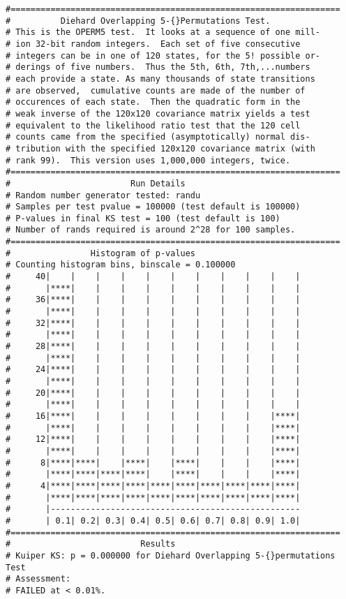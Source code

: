 \documentclass[12pt]{book}
\begin{document}
{\begin{verbatim}
#==================================================================
#          Diehard Overlapping 5-{}Permutations Test.
# This is the OPERM5 test.  It looks at a sequence of one mill- 
# ion 32-bit random integers.  Each set of five consecutive     
# integers can be in one of 120 states, for the 5! possible or- 
# derings of five numbers.  Thus the 5th, 6th, 7th,...numbers   
# each provide a state. As many thousands of state transitions  
# are observed,  cumulative counts are made of the number of    
# occurences of each state.  Then the quadratic form in the     
# weak inverse of the 120x120 covariance matrix yields a test   
# equivalent to the likelihood ratio test that the 120 cell     
# counts came from the specified (asymptotically) normal dis-   
# tribution with the specified 120x120 covariance matrix (with  
# rank 99).  This version uses 1,000,000 integers, twice.       
#==================================================================
#                        Run Details
# Random number generator tested: randu
# Samples per test pvalue = 100000 (test default is 100000)
# P-values in final KS test = 100 (test default is 100)
# Number of rands required is around 2^28 for 100 samples.
#==================================================================
#                Histogram of p-values
# Counting histogram bins, binscale = 0.100000
#     40|    |    |    |    |    |    |    |    |    |    |
#       |****|    |    |    |    |    |    |    |    |    |
#     36|****|    |    |    |    |    |    |    |    |    |
#       |****|    |    |    |    |    |    |    |    |    |
#     32|****|    |    |    |    |    |    |    |    |    |
#       |****|    |    |    |    |    |    |    |    |    |
#     28|****|    |    |    |    |    |    |    |    |    |
#       |****|    |    |    |    |    |    |    |    |    |
#     24|****|    |    |    |    |    |    |    |    |    |
#       |****|    |    |    |    |    |    |    |    |    |
#     20|****|    |    |    |    |    |    |    |    |    |
#       |****|    |    |    |    |    |    |    |    |    |
#     16|****|    |    |    |    |    |    |    |    |****|
#       |****|    |    |    |    |    |    |    |    |****|
#     12|****|    |    |    |    |    |    |    |    |****|
#       |****|    |    |    |    |    |    |    |    |****|
#      8|****|****|    |****|    |****|    |    |    |****|
#       |****|****|****|****|    |****|    |    |    |****|
#      4|****|****|****|****|****|****|****|****|****|****|
#       |****|****|****|****|****|****|****|****|****|****|
#       |--------------------------------------------------
#       | 0.1| 0.2| 0.3| 0.4| 0.5| 0.6| 0.7| 0.8| 0.9| 1.0|
#==================================================================
#                          Results
# Kuiper KS: p = 0.000000 for Diehard Overlapping 5-{}permutations Test
# Assessment:
# FAILED at < 0.01%.


\end{verbatim}}
\end{document}
